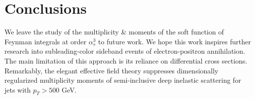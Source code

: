 \section{Conclusions}\label{sec:conclusions}

We leave the study of the multiplicity & moments of the soft function of
Feynman integrals at order $\alpha_s^3$ to future work. We hope this
work inspires further research into subleading-color sideband events of
electron-positron annihilation. The main limitation of this approach is
its reliance on differential cross sections. Remarkably, the elegant
effective field theory suppresses dimensionally regularized multiplicity
moments of semi-inclusive deep inelastic scattering for jets with $p_T >
500$ GeV.

